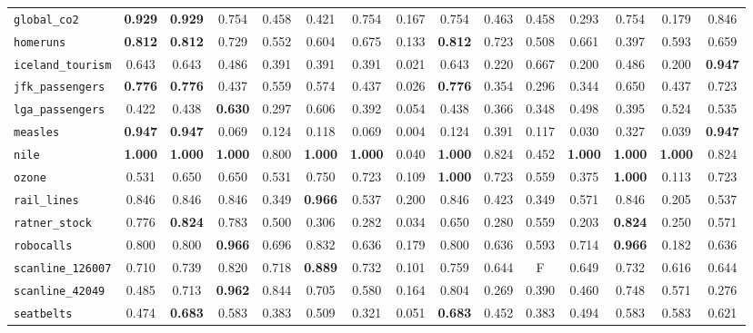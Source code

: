 \begin{tabular}{lcccccccccccccc}
\verb+global_co2+ & \textbf{0.929} & \textbf{0.929} & 0.754 & 0.458 & 0.421 & 0.754 & 0.167 & 0.754 & 0.463 & 0.458 & 0.293 & 0.754 & 0.179 & 0.846\\
\verb+homeruns+ & \textbf{0.812} & \textbf{0.812} & 0.729 & 0.552 & 0.604 & 0.675 & 0.133 & \textbf{0.812} & 0.723 & 0.508 & 0.661 & 0.397 & 0.593 & 0.659\\
\verb+iceland_tourism+ & 0.643 & 0.643 & 0.486 & 0.391 & 0.391 & 0.391 & 0.021 & 0.643 & 0.220 & 0.667 & 0.200 & 0.486 & 0.200 & \textbf{0.947}\\
\verb+jfk_passengers+ & \textbf{0.776} & \textbf{0.776} & 0.437 & 0.559 & 0.574 & 0.437 & 0.026 & \textbf{0.776} & 0.354 & 0.296 & 0.344 & 0.650 & 0.437 & 0.723\\
\verb+lga_passengers+ & 0.422 & 0.438 & \textbf{0.630} & 0.297 & 0.606 & 0.392 & 0.054 & 0.438 & 0.366 & 0.348 & 0.498 & 0.395 & 0.524 & 0.535\\
\verb+measles+ & \textbf{0.947} & \textbf{0.947} & 0.069 & 0.124 & 0.118 & 0.069 & 0.004 & 0.124 & 0.391 & 0.117 & 0.030 & 0.327 & 0.039 & \textbf{0.947}\\
\verb+nile+ & \textbf{1.000} & \textbf{1.000} & \textbf{1.000} & 0.800 & \textbf{1.000} & \textbf{1.000} & 0.040 & \textbf{1.000} & 0.824 & 0.452 & \textbf{1.000} & \textbf{1.000} & \textbf{1.000} & 0.824\\
\verb+ozone+ & 0.531 & 0.650 & 0.650 & 0.531 & 0.750 & 0.723 & 0.109 & \textbf{1.000} & 0.723 & 0.559 & 0.375 & \textbf{1.000} & 0.113 & 0.723\\
\verb+rail_lines+ & 0.846 & 0.846 & 0.846 & 0.349 & \textbf{0.966} & 0.537 & 0.200 & 0.846 & 0.423 & 0.349 & 0.571 & 0.846 & 0.205 & 0.537\\
\verb+ratner_stock+ & 0.776 & \textbf{0.824} & 0.783 & 0.500 & 0.306 & 0.282 & 0.034 & 0.650 & 0.280 & 0.559 & 0.203 & \textbf{0.824} & 0.250 & 0.571\\
\verb+robocalls+ & 0.800 & 0.800 & \textbf{0.966} & 0.696 & 0.832 & 0.636 & 0.179 & 0.800 & 0.636 & 0.593 & 0.714 & \textbf{0.966} & 0.182 & 0.636\\
\verb+scanline_126007+ & 0.710 & 0.739 & 0.820 & 0.718 & \textbf{0.889} & 0.732 & 0.101 & 0.759 & 0.644 & F & 0.649 & 0.732 & 0.616 & 0.644\\
\verb+scanline_42049+ & 0.485 & 0.713 & \textbf{0.962} & 0.844 & 0.705 & 0.580 & 0.164 & 0.804 & 0.269 & 0.390 & 0.460 & 0.748 & 0.571 & 0.276\\
\verb+seatbelts+ & 0.474 & \textbf{0.683} & 0.583 & 0.383 & 0.509 & 0.321 & 0.051 & \textbf{0.683} & 0.452 & 0.383 & 0.494 & 0.583 & 0.583 & 0.621\\

\end{tabular}
